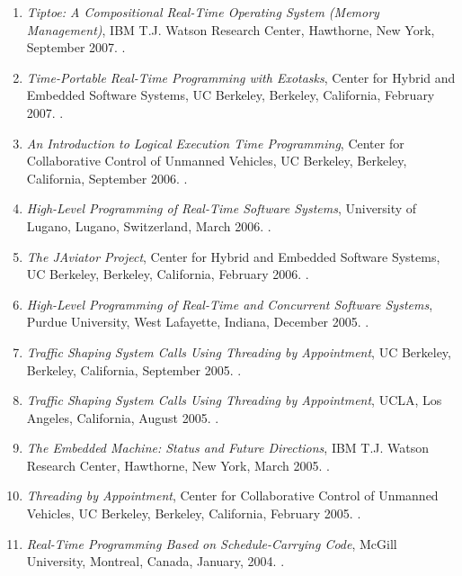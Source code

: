 {\begin{enumerate}
\item \emph{Tiptoe: A Compositional Real-Time Operating System (Memory Management)},
IBM T.J. Watson Research Center, Hawthorne, New York, September 2007.
.

\item \emph{Time-Portable Real-Time Programming with Exotasks},
Center for Hybrid and Embedded Software Systems, UC Berkeley, Berkeley, California, February 2007.
.

\item \emph{An Introduction to Logical Execution Time Programming},
Center for Collaborative Control of Unmanned Vehicles, UC Berkeley, Berkeley, California, September 2006.
.

\item \emph{High-Level Programming of Real-Time Software Systems},
University of Lugano, Lugano, Switzerland, March 2006.
.

\item \emph{The JAviator Project},
Center for Hybrid and Embedded Software Systems, UC Berkeley, Berkeley, California, February 2006.
.

\item \emph{High-Level Programming of Real-Time and Concurrent Software Systems},
Purdue University, West Lafayette, Indiana, December 2005.
.

\item \emph{Traffic Shaping System Calls Using Threading by Appointment},
UC Berkeley, Berkeley, California, September 2005.
.

\item \emph{Traffic Shaping System Calls Using Threading by Appointment},
UCLA, Los Angeles, California, August 2005.
.

\item \emph{The Embedded Machine: Status and Future Directions},
IBM T.J. Watson Research Center, Hawthorne, New York, March 2005.
.

\item \emph{Threading by Appointment},
Center for Collaborative Control of Unmanned Vehicles, UC Berkeley, Berkeley, California, February 2005.
.

\item \emph{Real-Time Programming Based on Schedule-Carrying Code},
McGill University, Montreal, Canada, January, 2004.
.


\end{enumerate}}
